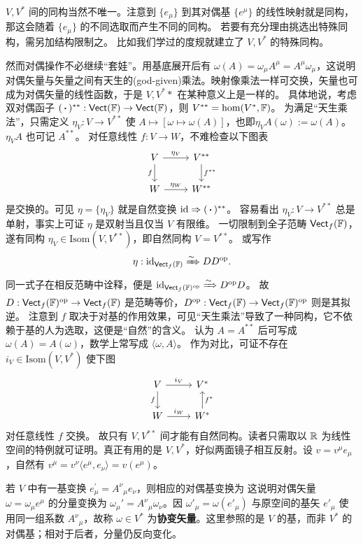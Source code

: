 $V,V^*$ 间的同构当然不唯一。注意到 $\{e_\mu\}$ 到其对偶基 $\{e^\mu\}$ 的线性映射就是同构，那这会随着 $\{e_\mu\}$ 的不同选取而产生不同的同构。
若要有充分理由挑选出特殊同构，需另加结构限制之。
比如我们学过的度规就建立了 $V,V^*$ 的特殊同构。

然而对偶操作不必继续“套娃”。用基底展开后有 $\omega(A)=\omega_\mu A^\mu=A^\mu\omega_\mu$，这说明对偶矢量与矢量之间有天生的(god-given)乘法。映射像乘法一样可交换，矢量也可成为对偶矢量的线性函数，于是 $V,V^**$ 在某种意义上是一样的。
具体地说，考虑双对偶函子 $(\oo)^{**}:\cate{Vect}(\F)\to\cate{Vect}(\F)$，则 $V^{**}=\hom(V^*,\mathbb{F})$。
为满足“天生乘法”，只需定义 $\eta_V:V\to V^{**}$ 使 $A\mapsto [\omega\mapsto\omega(A)]$，也即$\eta_V A(\omega):=\omega(A)$。$\eta_V A$ 也可记 $A^{**}$。
对任意线性 $f:V\to W$，不难检查以下图表
\[\begin{tikzcd}
    V \arrow[r, "\eta_V"] \ar[d, "f"'] & V^{**} \arrow[d, "f^{**}"] \\
    W \arrow[r, "\eta_W"] & W^{**}
\end{tikzcd}\]
是交换的。可见 $\eta=\{\eta_V\}$ 就是自然变换 $\id\Rightarrow (\oo)^{**}$。
容易看出 $\eta_V:V\to V^{**}$ 总是单射，事实上可证 $\eta$ 是双射当且仅当 $V$ 有限维。
一切限制到全子范畴 $\mathsf{Vect}_f(\mathbb{F})$，遂有同构 $\eta_V\in\mathrm{Isom}(V,V^{**})$，即自然同构 $V=V^{* *}$。
或写作
\[\eta: \mathrm{id}_{\mathsf{Vect}_f(\mathbb{F})} \xRightarrow{\sim} DD^\mathrm{op}.\]
同一式子在相反范畴中诠释，便是 $\mathrm{id}_{\mathsf{Vect}_f(\mathbb{F})^\mathrm{op}} \xRightarrow{\sim} D^\mathrm{op}D$。
故 $D: \mathsf{Vect}_f(\mathbb{F})^\text{op} \to \mathsf{Vect}_f(\mathbb{F})$ 是范畴等价，$D^\text{op}: \mathsf{Vect}_f(\mathbb{F}) \to \mathsf{Vect}_f(\mathbb{F})^\text{op}$ 则是其拟逆。
注意到 $f$ 取决于对基的作用效果，可见“天生乘法”导致了一种同构，它不依赖于基的人为选取，这便是“自然”的含义。
认为 $A=A^{**}$ 后可写成 $\omega(A)=A(\omega)$，数学上常写成 $\langle\omega,A\rangle$。
作为对比，可证不存在 $i_V\in\mathrm{Isom}(V,V^*)$ 使下图
\[\begin{tikzcd}
    V \arrow[r, "i_V"] \ar[d, "f"'] & V^{*} \\
    W \arrow[r, "i_W"] & W^{*} \arrow[u, "f^{*}"']
\end{tikzcd}\]
对任意线性 $f$ 交换。
故只有 $V,V^{* *}$ 间才能有自然同构。读者只需取以 $\mathbb{R}$ 为线性空间的特例就可证明。真正有用的是 $V,V^*$，好似两面镜子相互反射。设 $v=v^\mu e_\mu$，自然有 $v^\mu=v^\nu \langle e^\mu,e_\nu\rangle=v(e^\mu)$。

\begin{theorem}
    若 $V$ 中有一基变换 $e_\mu^{\prime}=A^\nu{ }_\mu e_\nu$，则相应的对偶基变换为
这说明对偶矢量 $\omega=\omega_\mu e^\mu$ 的分量变换为 $\omega_\mu'=A^\nu{}_\mu\omega_\nu$。因 $\omega'_\mu=\omega(e'_\mu)$ 与原空间的基矢 $e'_\mu$ 使用同一组系数 $A^\nu{}_\mu$，故称 $\omega\in V^*$ 为\textbf{协变矢量}。这里参照的是 $V$ 的基，而非 $V^*$ 的对偶基；相对于后者，分量仍反向变化。
\end{theorem}

